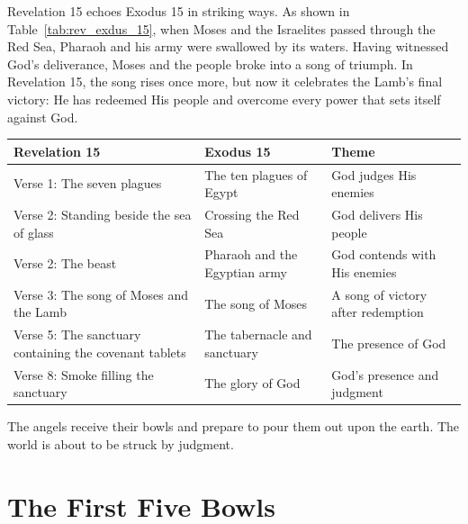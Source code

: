 \begin{InDepth}

Revelation 15 echoes Exodus 15 in striking ways. As shown in Table~\ref{tab:rev_exdus_15}, when Moses and the Israelites passed through the Red Sea, Pharaoh and his army were swallowed by its waters. Having witnessed God's deliverance, Moses and the people broke into a song of triumph. In Revelation 15, the song rises once more, but now it celebrates the Lamb's final victory: He has redeemed His people and overcome every power that sets itself against God.

\par\medskip\noindent
\begin{minipage}{\linewidth}
\centering\small
\renewcommand{\arraystretch}{1}\setlength{\tabcolsep}{4pt}
\label{tab:rev_exdus_15}
\begin{tabularx}{\linewidth}{@{}>{\raggedright\arraybackslash}X
                               >{\raggedright\arraybackslash}X
                               >{\raggedright\arraybackslash}X@{}}
\hline
Revelation 15 & Exodus 15 & Theme \\
\hline
Verse 1: The seven plagues & The ten plagues of Egypt & God judges His enemies \\
Verse 2: Standing beside the sea of glass & Crossing the Red Sea & God delivers His people \\
Verse 2: The beast & Pharaoh and the Egyptian army & God contends with His enemies \\
Verse 3: The song of Moses and the Lamb & The song of Moses & A song of victory after redemption \\
Verse 5: The sanctuary containing the covenant tablets & The tabernacle and sanctuary & The presence of God \\
Verse 8: Smoke filling the sanctuary & The glory of God & God's presence and judgment \\
\hline
\end{tabularx}
\end{minipage}
\end{InDepth}

The angels receive their bowls and prepare to pour them out upon the earth. The world is about to be struck by judgment. 

\section{The First Five Bowls}


